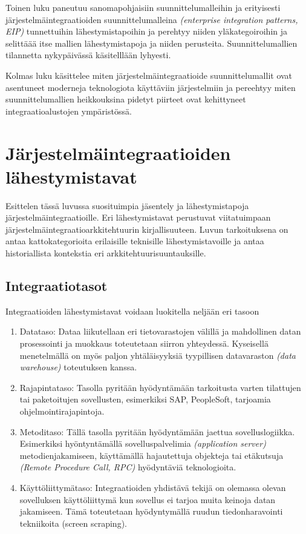 Toinen luku paneutuu sanomapohjaisiin suunnittelumalleihin ja erityisesti järjestelmäintegraatioiden suunnittelumalleina \textit{(enterprise integration patterns, EIP)} tunnettuihin lähestymistapoihin ja perehtyy niiden yläkategoiroihin ja selittäää itse mallien lähestymistapoja ja niiden perusteita. Suunnittelumallien tilannetta nykypäivässä käsitelllään lyhyesti.

Kolmas luku käsittelee miten järjestelmäintegraatioide suunnittelumallit ovat asentuneet moderneja teknologiota käyttäviin järjestelmiin ja pereehtyy miten suunnittelumallien heikkouksina pidetyt piirteet ovat kehittyneet integraatioalustojen ympäristössä.


\chapter{Järjestelmäintegraatioiden lähestymistavat}

Esittelen tässä luvussa suosituimpia jäsentely ja lähestymistapoja järjestelmäintegraatioille. Eri lähestymistavat perustuvat viitatuimpaan järjestelmäintegraatioarkkitehtuurin kirjallisuuteen. Luvun tarkoituksena on antaa kattokategorioita erilaisille teknisille lähestymistavoille ja antaa historiallista kontekstia eri arkkitehtuurisuuntauksille.

\section{Integraatiotasot}

Integraatioiden lähestymistavat voidaan luokitella neljään eri tasoon \citep{linthicum2000enterprise}

\begin{enumerate}
   \item Datataso: Dataa liikutellaan eri tietovarastojen välillä ja mahdollinen datan prosessointi ja muokkaus toteutetaan siirron yhteydessä. Kyseisellä menetelmällä on myös paljon yhtäläisyyksiä tyypillisen datavaraston \textit{(data warehouse)} toteutuksen kanssa.
   \item Rajapintataso: Tasolla pyritään hyödyntämään tarkoitusta varten tilattujen tai paketoitujen sovellusten, esimerkiksi SAP, PeopleSoft, tarjoamia ohjelmointirajapintoja.
   \item Metoditaso: Tällä tasolla pyritään hyödyntämään jaettua sovelluslogiikka. Esimerkiksi hyöntyntämällä sovelluspalvelimia \textit{(application server)} metodienjakamiseen,  käyttämällä hajautettuja objekteja tai etäkutsuja \textit{(Remote Procedure Call, RPC)} hyödyntäviä teknologioita.
   \item Käyttöliittymätaso: Integraatioiden yhdistävä tekijä on olemassa olevan sovelluksen käyttöliittymä kun sovellus ei tarjoa muita keinoja datan jakamiseen. Tämä toteutetaan hyödyntymällä ruudun tiedonharavointi tekniikoita (screen scraping).
   
\end{enumerate}

